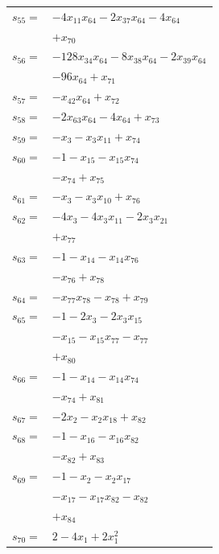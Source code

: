 \begin{longtable}{@{}r@{\;}l@{}}
\(s_{55}=\) & \(\displaystyle -4x_{11}x_{64} -2x_{37}x_{64} -4x_{64}\) \\
 & \(\displaystyle +x_{70}\) \\[3pt]
\(s_{56}=\) & \(\displaystyle -128x_{34}x_{64} -8x_{38}x_{64} -2x_{39}x_{64}\) \\
 & \(\displaystyle -96x_{64} +x_{71}\) \\[3pt]
\(s_{57}=\) & \(\displaystyle -x_{42}x_{64} +x_{72}\) \\[3pt]
\(s_{58}=\) & \(\displaystyle -2x_{63}x_{64} -4x_{64} +x_{73}\) \\[3pt]
\(s_{59}=\) & \(\displaystyle -x_{3} -x_{3}x_{11} +x_{74}\) \\[3pt]
\(s_{60}=\) & \(\displaystyle -1 -x_{15} -x_{15}x_{74}\) \\
 & \(\displaystyle -x_{74} +x_{75}\) \\[3pt]
\(s_{61}=\) & \(\displaystyle -x_{3} -x_{3}x_{10} +x_{76}\) \\[3pt]
\(s_{62}=\) & \(\displaystyle -4x_{3} -4x_{3}x_{11} -2x_{3}x_{21}\) \\
 & \(\displaystyle +x_{77}\) \\[3pt]
\(s_{63}=\) & \(\displaystyle -1 -x_{14} -x_{14}x_{76}\) \\
 & \(\displaystyle -x_{76} +x_{78}\) \\[3pt]
\(s_{64}=\) & \(\displaystyle -x_{77}x_{78} -x_{78} +x_{79}\) \\[3pt]
\(s_{65}=\) & \(\displaystyle -1 -2x_{3} -2x_{3}x_{15}\) \\
 & \(\displaystyle -x_{15} -x_{15}x_{77} -x_{77}\) \\
 & \(\displaystyle +x_{80}\) \\[3pt]
\(s_{66}=\) & \(\displaystyle -1 -x_{14} -x_{14}x_{74}\) \\
 & \(\displaystyle -x_{74} +x_{81}\) \\[3pt]
\(s_{67}=\) & \(\displaystyle -2x_{2} -x_{2}x_{18} +x_{82}\) \\[3pt]
\(s_{68}=\) & \(\displaystyle -1 -x_{16} -x_{16}x_{82}\) \\
 & \(\displaystyle -x_{82} +x_{83}\) \\[3pt]
\(s_{69}=\) & \(\displaystyle -1 -x_{2} -x_{2}x_{17}\) \\
 & \(\displaystyle -x_{17} -x_{17}x_{82} -x_{82}\) \\
 & \(\displaystyle +x_{84}\) \\[3pt]
\(s_{70}=\) & \(\displaystyle 2 -4x_{1} +2x_{1}^{2}\) \\

\end{longtable}
